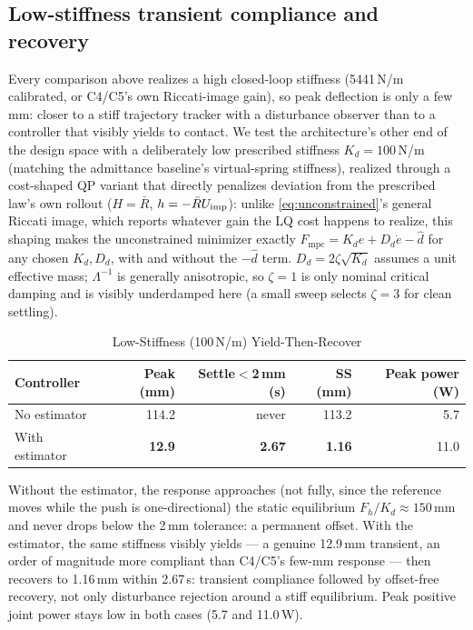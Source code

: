 \documentclass[conference]{IEEEtran}
\newcommand{\Fmpc}{F_{\mathrm{mpc}}}
\newcommand{\dhat}{\hat d}
\begin{document}
\subsection{Low-stiffness transient compliance and recovery}
\label{sec:lowk}

Every comparison above realizes a high closed-loop stiffness (5441\,N/m
calibrated, or C4/C5's own Riccati-image gain), so peak deflection is only
a few mm: closer to a stiff trajectory tracker with a disturbance observer
than to a controller that visibly yields to contact. We test the
architecture's other end of the design space with a deliberately low
prescribed stiffness $K_d=100$\,N/m (matching the admittance baseline's
virtual-spring stiffness), realized through a cost-shaped QP variant
that directly penalizes deviation from the prescribed law's own rollout
($H=\bar R$, $h=-\bar RU_{\rm imp}$): unlike \eqref{eq:unconstrained}'s
general Riccati image, which reports whatever gain the LQ cost happens
to realize, this shaping makes the unconstrained minimizer exactly
$\Fmpc=K_de+D_d\dot e-\dhat$ for any chosen $K_d,D_d$, with and without
the $-\dhat$ term. $D_d=2\zeta\sqrt{K_d}$ assumes a unit effective mass;
$\Lambda^{-1}$ is generally anisotropic, so $\zeta=1$ is only nominal
critical damping and is visibly underdamped here (a small sweep selects
$\zeta=3$ for clean settling).

\begin{table}[t]
\caption{Low-Stiffness (100\,N/m) Yield-Then-Recover}
\label{tab:lowk}
\centering
\footnotesize
\setlength{\tabcolsep}{3.5pt}
\begin{tabular}{@{}lrrrr@{}}
\toprule
Controller & Peak (mm) & Settle$<$2\,mm (s) & SS (mm) & Peak power (W)\\
\midrule
No estimator & 114.2 & never & 113.2 & 5.7\\
With estimator & \textbf{12.9} & \textbf{2.67} & \textbf{1.16} & 11.0\\
\bottomrule
\end{tabular}
\end{table}

Without the estimator, the response approaches (not fully, since the
reference moves while the push is one-directional) the static equilibrium
$F_h/K_d\approx150$\,mm and never drops below the 2\,mm tolerance: a
permanent offset. With the estimator, the same stiffness visibly yields
--- a genuine 12.9\,mm transient, an order of magnitude more compliant
than C4/C5's few-mm response --- then recovers to 1.16\,mm within 2.67\,s:
transient compliance followed by offset-free recovery, not only
disturbance rejection around a stiff equilibrium. Peak positive joint
power stays low in both cases (5.7 and 11.0\,W).
\end{document}
